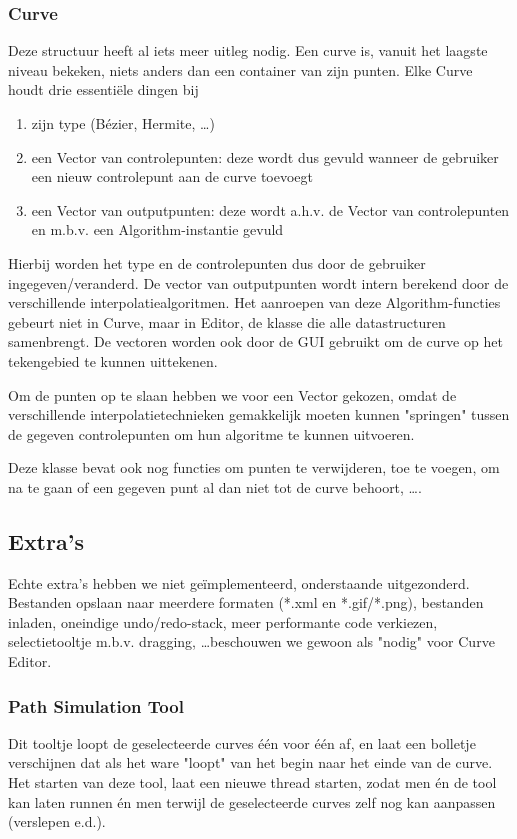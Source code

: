 \documentclass[a4paper,11pt,oneside, titlepage]{article}
\begin{document}
\subsubsection{Curve}
Deze structuur heeft al iets meer uitleg nodig. Een curve is, vanuit het laagste niveau bekeken, niets 
anders dan een container van zijn punten.\newline
Elke Curve houdt drie essenti\"ele dingen bij
\begin{enumerate}
\item zijn type (B\'ezier, Hermite, \ldots)
\item een Vector van controlepunten: deze wordt dus gevuld wanneer de gebruiker een nieuw controlepunt aan de curve toevoegt
\item een Vector van outputpunten: deze wordt a.h.v. de Vector van controlepunten en m.b.v. een Algorithm-instantie gevuld
\end{enumerate}

Hierbij worden het type en de controlepunten dus door de gebruiker ingegeven/veranderd. De vector van outputpunten
wordt intern berekend door de verschillende interpolatiealgoritmen. Het aanroepen van deze Algorithm-functies gebeurt niet in Curve, maar in Editor, de klasse die alle datastructuren samenbrengt.
De vectoren worden ook door de GUI gebruikt om de curve op het tekengebied te kunnen uittekenen.\newline

Om de punten op te slaan hebben we voor een Vector gekozen, omdat de verschillende
interpolatietechnieken gemakkelijk moeten kunnen "springen" tussen de gegeven controlepunten om
hun algoritme te kunnen uitvoeren.

Deze klasse bevat ook nog functies om punten te verwijderen, toe te voegen, om na te gaan of een gegeven punt al dan niet tot de curve behoort, \ldots.
\subsection{Extra's}
Echte extra's hebben we niet ge\"implementeerd, onderstaande uitgezonderd. Bestanden opslaan naar meerdere formaten (*.xml en *.gif/*.png), bestanden inladen, oneindige undo/redo-stack, meer performante code verkiezen, selectietooltje m.b.v. dragging, \ldots beschouwen we gewoon als "nodig" voor Curve Editor.
\subsubsection{Path Simulation Tool}
Dit tooltje loopt de geselecteerde curves \'e\'en voor \'e\'en af, en laat een bolletje verschijnen dat als het ware "loopt" van het begin naar het einde van de curve. Het starten van deze tool, laat een nieuwe thread starten, zodat men \'en de tool kan laten runnen \'en men terwijl de geselecteerde curves zelf nog kan aanpassen (verslepen e.d.). 
\end{document}
